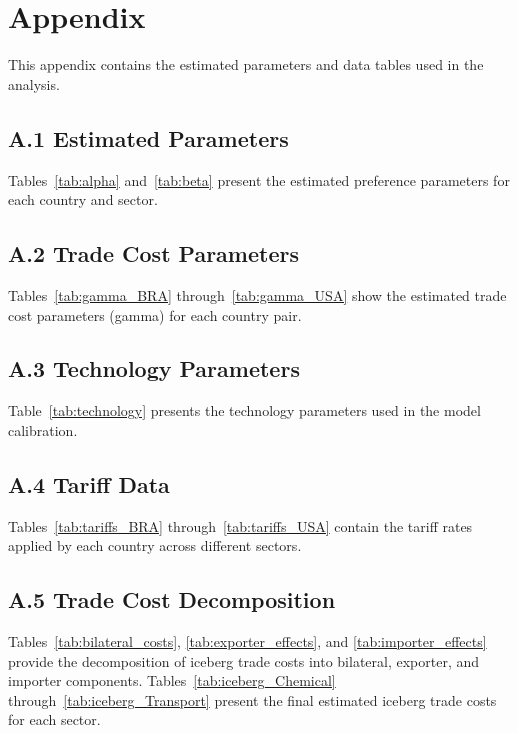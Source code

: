 \section*{Appendix}

This appendix contains the estimated parameters and data tables used in the analysis.

\subsection*{A.1 Estimated Parameters}
Tables~\ref{tab:alpha} and~\ref{tab:beta} present the estimated preference parameters for each country and sector.

\subsection*{A.2 Trade Cost Parameters}
Tables~\ref{tab:gamma_BRA} through~\ref{tab:gamma_USA} show the estimated trade cost parameters (gamma) for each country pair.

\subsection*{A.3 Technology Parameters}
Table~\ref{tab:technology} presents the technology parameters used in the model calibration.

\subsection*{A.4 Tariff Data}
Tables~\ref{tab:tariffs_BRA} through~\ref{tab:tariffs_USA} contain the tariff rates applied by each country across different sectors.

\subsection*{A.5 Trade Cost Decomposition}
Tables~\ref{tab:bilateral_costs}, \ref{tab:exporter_effects}, and \ref{tab:importer_effects} provide the decomposition of iceberg trade costs into bilateral, exporter, and importer components. Tables~\ref{tab:iceberg_Chemical} through~\ref{tab:iceberg_Transport} present the final estimated iceberg trade costs for each sector.

\begin{landscape}


\end{landscape}

